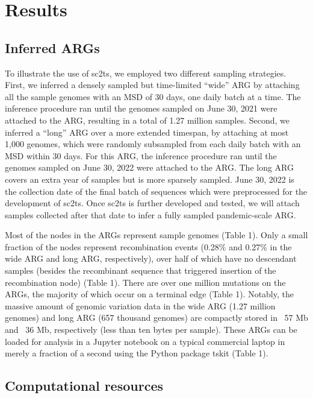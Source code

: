 \documentclass{article}
\begin{document}
\section{Results}

\subsection{Inferred ARGs}

To illustrate the use of sc2ts, we employed two different sampling strategies. First, we inferred a densely sampled but time-limited “wide” ARG by attaching all the sample genomes with an MSD of 30 days, one daily batch at a time. The inference procedure ran until the genomes sampled on June 30, 2021 were attached to the ARG, resulting in a total of 1.27 million samples. Second, we inferred a “long” ARG over a more extended timespan, by attaching at most 1,000 genomes, which were randomly subsampled from each daily batch with an MSD within 30 days. For this ARG, the inference procedure ran until the genomes sampled on June 30, 2022 were attached to the ARG. The long ARG covers an extra year of samples but is more sparsely sampled. June 30, 2022 is the collection date of the final batch of sequences which were preprocessed for the development of sc2ts. Once sc2ts is further developed and tested, we will attach samples collected after that date to infer a fully sampled pandemic-scale ARG.

Most of the nodes in the ARGs represent sample genomes (Table 1). Only a small fraction of the nodes represent recombination events (0.28\% and 0.27\% in the wide ARG and long ARG, respectively), over half of which have no descendant samples (besides the recombinant sequence that triggered insertion of the recombination node) (Table 1). There are over one million mutations on the ARGs, the majority of which occur on a terminal edge (Table 1). Notably, the massive amount of genomic variation data in the wide ARG (1.27 million genomes) and long ARG (657 thousand genomes) are compactly stored in ~57 Mb and ~36 Mb, respectively (less than ten bytes per sample). These ARGs can be loaded for analysis in a Jupyter notebook on a typical commercial laptop in merely a fraction of a second using the Python package tskit (Table 1).

\subsection{Computational resources}
\end{document}
